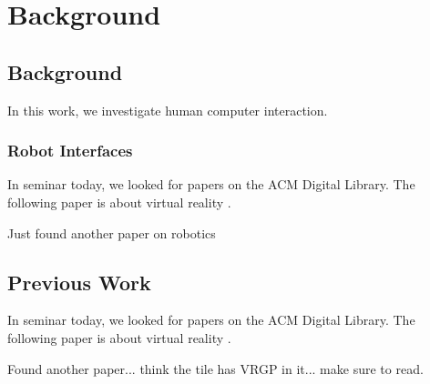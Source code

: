 \chapter{Background}
\label{chap:background}

\section{Background}

In this work, we investigate human computer interaction. 

\subsection{Robot Interfaces}

In seminar today, we looked for papers on the ACM Digital Library. The
following paper is about virtual reality \cite{Kreylos:2006:ESW:1128923.1128948}.

Just found another paper on robotics  \cite{Drascic89}

\section{Previous Work}

In seminar today, we looked for papers on the ACM Digital Library. The
following paper is about virtual reality
\cite{Kreylos:2006:ESW:1128923.1128948}.

Found another paper... think the tile has VRGP in it... make sure to read.





